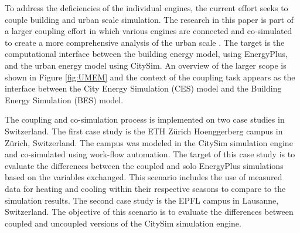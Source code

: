 \documentclass{tBPS2e}
\theoremstyle{plain}
\theoremstyle{definition}
\theoremstyle{remark}
\newcommand{\noteDT}[1]{\footnote{\textcolor{green}{#1}}}
\begin{document}
To address the deficiencies of the individual engines, the current
effort seeks to couple building and urban scale simulation. The research in
this paper is part of a larger coupling effort in which various engines are
connected and co-simulated to create a more comprehensive analysis of the
urban scale \citep{Dorer:2013vt,Allegrini:2012kx}. The target is the
computational interface between the building energy model, using EnergyPlus,
and the urban energy model using CitySim. An overview of the larger scope is
shown in Figure \ref{fig:UMEM} and the context of the coupling task appears as the interface between the City Energy Simulation (CES) model and the
Building Energy Simulation (BES) model.


The coupling and co-simulation process is implemented on two case studies in
Switzerland. The first case study is the ETH Z\"urich Hoenggerberg campus in
Z\"urich, Switzerland. The campus was modeled in the CitySim simulation engine
and co-simulated using work-flow automation. The target of this case study is
to evaluate the differences between the coupled and solo EnergyPlus
simulations based on the variables exchanged. This scenario includes the use
of measured data for heating and cooling within their respective seasons to
compare to the simulation results. The second case study is the EPFL campus in
Lausanne, Switzerland. The objective of this scenario is to evaluate the
differences between coupled and uncoupled versions of the CitySim simulation
engine.

\end{document}
